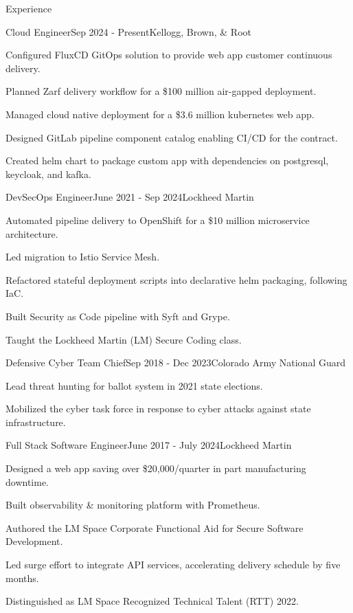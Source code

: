 \documentclass[
	a4paper, %
	11pt, %
]{resume} %
\begin{document}
\begin{rSection}{Experience}

	\begin{rSubsection}{Cloud Engineer}{Sep 2024 - Present}{Kellogg, Brown, \& Root}
		\item Configured FluxCD GitOps solution to provide web app customer continuous delivery.
		\item Planned Zarf delivery workflow for a \$100 million air-gapped deployment.
		\item Managed cloud native deployment for a \$3.6 million kubernetes web app.
		\item Designed GitLab pipeline component catalog enabling CI/CD for the contract.
		\item Created helm chart to package custom app with dependencies on postgresql, keycloak, and kafka.
	\end{rSubsection}
	\begin{rSubsection}{DevSecOps Engineer}{June 2021 - Sep 2024}{Lockheed Martin}
		\item Automated pipeline delivery to OpenShift for a \$10 million microservice architecture.
		\item Led migration to Istio Service Mesh.
		\item Refactored stateful deployment scripts into declarative helm packaging, following IaC.
		\item Built Security as Code pipeline with Syft and Grype.
		\item Taught the Lockheed Martin (LM) Secure Coding class.
	\end{rSubsection}
	\begin{rSubsection}{Defensive Cyber Team Chief}{Sep 2018 - Dec 2023}{Colorado Army National Guard}
		\item Lead threat hunting for ballot system in 2021 state elections.
		\item Mobilized the cyber task force in response to cyber attacks against state infrastructure.
	\end{rSubsection}
	\begin{rSubsection}{Full Stack Software Engineer}{June 2017 - July 2024}{Lockheed Martin}
		\item Designed a web app saving over \$20,000/quarter in part manufacturing downtime.
		\item Built observability \& monitoring platform with Prometheus.
		\item Authored the LM Space Corporate Functional Aid for Secure Software Development.
		\item Led surge effort to integrate API services, accelerating delivery schedule by five months.
		\item Distinguished as LM Space Recognized Technical Talent (RTT) 2022.
	\end{rSubsection}
\end{rSection}
\end{document}
